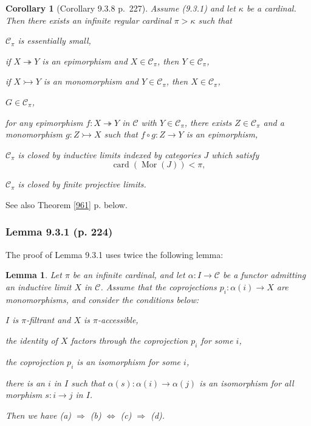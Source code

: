 \documentclass[12pt]{article}%
\newtheorem{lem}[thm]{Lemma}
\newtheorem{cor}[thm]{Corollary}
\theoremstyle{remark}
\theoremstyle{definition}
\newcommand{\nn}{\noindent}
\newcommand{\C}{\mathcal C}
\newcommand{\epi}{\twoheadrightarrow}
\newcommand{\mono}{\rightarrowtail}%
\newcommand{\ssi}{\Leftrightarrow}%
\newcommand{\then}{\Rightarrow}
\DeclareMathOperator{\card}{card}%
\DeclareMathOperator{\Mor}{Mor}
\begin{document}
\begin{cor}[Corollary 9.3.8 p.~227]\label{938}
Assume (9.3.1) and let $\kappa$ be a cardinal. Then there exists an infinite regular cardinal $\pi>\kappa$ such that 

\nn{\em(i)} $\C_\pi$ is essentially small,

\nn{\em(ii)} if $X\epi Y$ is an epimorphism and $X\in\C_\pi$, then $Y\in\C_\pi$,

\nn{\em(iii)} if $X\mono Y$ is an monomorphism and $Y\in\C_\pi$, then $X\in\C_\pi$,

\nn{\em(iv)} $G\in\C_\pi$,

\nn{\em(v)} for any epimorphism $f:X\epi Y$ in $\C$ with $Y\in\C_\pi$, there exists $Z\in\C_\pi$ and a monomorphism $g:Z\mono X$ such that $f\circ g:Z\to Y$ is an epimorphism,

\nn{\em(vi)} $\C_\pi$ is closed by inductive limits indexed by categories $J$ which satisfy $$\card(\Mor(J))<\pi,$$

\nn{\em(vii)} $\C_\pi$ is closed by finite projective limits.
\end{cor}

See also Theorem \ref{961} p. \pageref{961} below.

%

\subsubsection{Lemma 9.3.1 (p. 224)}

The proof of Lemma 9.3.1 uses twice the following lemma:

\begin{lem}\label{ppi}
Let $\pi$ be an infinite cardinal, and let $\alpha:I\to\C$ be a functor admitting an inductive limit $X$ in $\C$. Assume that the coprojections $p_i:\alpha(i)\to X$ are monomorphisms, and consider the conditions below:

\nn{\em(a)} $I$ is $\pi$-filtrant and $X$ is $\pi$-accessible,

\nn{\em(b)} the identity of $X$ factors through the coprojection $p_i$ for some $i$,

\nn{\em(c)} the coprojection $p_i$ is an isomorphism for some $i$,

\nn{\em(d)} there is an $i$ in $I$ such that $\alpha(s):\alpha(i)\to\alpha(j)$ is an isomorphism for all morphism $s:i\to j$ in $I$.

\nn Then we have {\em(a)} $\then$ {\em(b)} $\ssi$ {\em(c)} $\then$ {\em(d)}. 
\end{lem}
\end{document}
